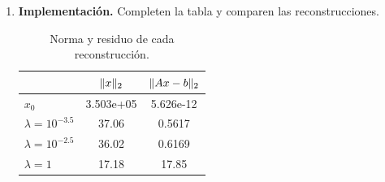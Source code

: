 \documentclass{article}
\begin{document}
\begin{enumerate}[label=\roman*., widest=iv]
\begin{itemize}
    \item \textbf{Caso $\mu_i \ll \lambda$:} Aquí, el factor $\frac{\mu_i}{\mu_i + \lambda} \approx 0$. La componente de la imagen verdadera se suprime o atenúa fuertemente. Sin embargo, el término del ruido ahora queda dividido por un valor cercano a $\lambda$ en lugar del minúsculo $\mu_i$, por lo que el ruido está acotado por $\frac{\|\eta\|_2}{2\sqrt{\lambda}}$ y no explota. El método actúa como un filtro que sacrifica información en estas direcciones para evitar la amplificación catastrófica del ruido.
    
    \item \textbf{Si $\lambda$ es muy pequeño ($\lambda \to 0$):} La regularización pierde su efecto y el método se aproxima a la solución de mínimos cuadrados ordinarios ($x_0$). El ruido en las componentes con $\mu_i \approx 0$ se amplificará de manera descontrolada. Se espera obtener una imagen completamente destruida por el ruido, similar a lo observado en el inciso (b).
    
    \item \textbf{Si $\lambda$ es muy grande ($\lambda \to \infty$):} El denominador $\mu_i + \lambda$ estará dominado por $\lambda$ para todos los $\mu_i$. Esto fuerza a que $\frac{\mu_i}{\mu_i + \lambda} \to 0$ en todas las componentes, lo que significa que el término de penalización $\|x\|_2^2$ es tan restrictivo que suprime la imagen verdadera. Se espera obtener una imagen que tienda a cero (completamente negra o plana), perdiendo toda información útil.
    
\end{itemize}

  \item \textbf{Implementación.} Completen la tabla y comparen las reconstrucciones.

  \begin{table}[H]
    \centering
    \begin{tabular}{>{\filatabla}l c c}
      \toprule[0.8bp]
                           & $\lVert x\rVert_2$ & $\lVert Ax - b\rVert_2$ \\
      \midrule[0.4bp]
      $x_0$                 &3.503e+05        &5.626e-12                  \\
      $\lambda = 10^{-3.5}$ &37.06            &0.5617                  \\
      $\lambda = 10^{-2.5}$ &36.02            &0.6169                   \\
      $\lambda = 1$         &17.18            &17.85                  \\
      \bottomrule[0.8bp]
    \end{tabular}
    \caption{Norma y residuo de cada reconstrucción.}
    \label{tab:ridge}
  \end{table}


\end{enumerate}
\end{document}

